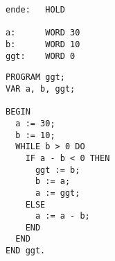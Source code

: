 \documentclass{lehramt-informatik-haupt}
\begin{document}
\begin{enumerate}
\begin{multicols}{2}
\begin{verbatim}
ende:   HOLD

a:      WORD 30
b:      WORD 10
ggt:    WORD 0
\end{verbatim}

\liSpaltenUmbruch
{}

\begin{verbatim}
PROGRAM ggt;
VAR a, b, ggt;

BEGIN
  a := 30;
  b := 10;
  WHILE b > 0 DO
    IF a - b < 0 THEN
      ggt := b;
      b := a;
      a := ggt;
    ELSE
      a := a - b;
    END
  END
END ggt.
\end{verbatim}

\end{multicols}

\end{enumerate}

\literatur
\end{document}
